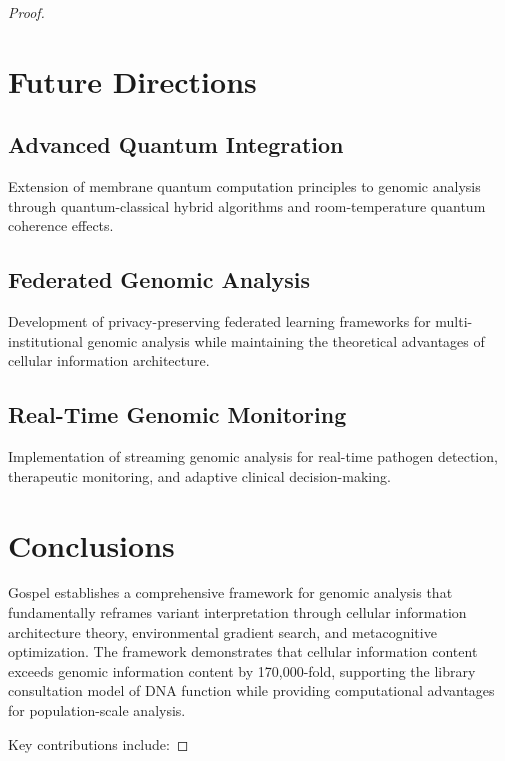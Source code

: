 \documentclass[12pt,a4paper]{article}
\begin{document}
\begin{proof}
\section{Future Directions}

\subsection{Advanced Quantum Integration}

Extension of membrane quantum computation principles to genomic analysis through quantum-classical hybrid algorithms and room-temperature quantum coherence effects.

\subsection{Federated Genomic Analysis}

Development of privacy-preserving federated learning frameworks for multi-institutional genomic analysis while maintaining the theoretical advantages of cellular information architecture.

\subsection{Real-Time Genomic Monitoring}

Implementation of streaming genomic analysis for real-time pathogen detection, therapeutic monitoring, and adaptive clinical decision-making.

\section{Conclusions}

Gospel establishes a comprehensive framework for genomic analysis that fundamentally reframes variant interpretation through cellular information architecture theory, environmental gradient search, and metacognitive optimization. The framework demonstrates that cellular information content exceeds genomic information content by 170,000-fold, supporting the library consultation model of DNA function while providing computational advantages for population-scale analysis.

Key contributions include:


\end{proof}
\end{document}

